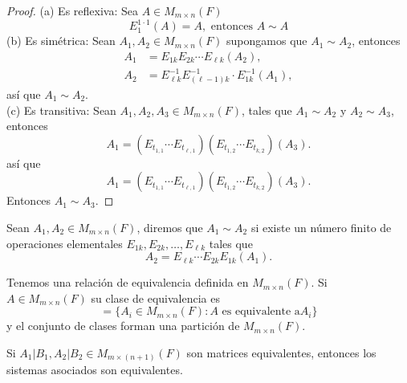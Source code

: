 \documentclass[12pt,a4paper]{book}
\begin{document}
    \begin{proof}
        (a) Es reflexiva: Sea $A\in M_{m\times n}(F)$
        \begin{equation*}
            E_{1}^{1\cdot1}(A)=A,\text{ entonces }A\sim A
        \end{equation*}
        (b) Es simétrica: Sean $A_{1},A_{2}\in M_{m\times n}(F)$ supongamos que $A_{1}\sim A_{2}$,
        entonces
        \begin{align*}
            A_{1}&=E_{1k}E_{2k}\cdots E_{\ell k}(A_{2}),\\
            A_{2}&=E_{\ell k}^{-1}E_{(\ell-1)k}^{-1}\cdot E_{1k}^{-1}(A_{1}),
        \end{align*}
        así que $A_{1}\sim A_{2}$.\\
        (c) Es transitiva: Sean $A_{1},A_{2},A_{3}\in M_{m\times n}(F)$, tales que $A_{1}\sim A_{2}$ y $A_{2}\sim A_{3}$,
        entonces
        \begin{equation*}
            A_{1}=(E_{t_{1,1}}\cdots E_{t_{\ell,1}})(E_{t_{1,2}}\cdots E_{t_{k,2}})(A_{3}).
        \end{equation*}
        así que
        \begin{equation*}
            A_{1}=(E_{t_{1,1}}\cdots E_{t_{\ell,1}})(E_{t_{1,2}}\cdots E_{t_{k,2}})(A_{3}).
        \end{equation*}
        Entonces $A_{1}\sim A_{3}$.
    \end{proof}

    \begin{definicion}
    \label{def:6}
        Sean $A_{1},A_{2}\in M_{m\times n}(F)$, diremos que $A_{1}\sim A_{2}$ si existe un número finito de
        operaciones elementales $E_{1k},E_{2k},\dots,E_{\ell k}$ tales que
        \begin{equation*}
            A_{2}=E_{\ell k}\cdots E_{2k}E_{1k}(A_{1}).
        \end{equation*}
    \end{definicion}

    Tenemos una relación de equivalencia definida en $M_{m\times n}(F)$. Si $A\in M_{m\times n}(F)$ su clase
    de equivalencia es
    \begin{equation*}
        [A]=\biggl\{A_{i}\in M_{m\times n}(F):A\text{ es equivalente a} A_{i}\biggr\}
    \end{equation*}
    y el conjunto de clases forman una partición de $M_{m\times n}(F)$.

    \begin{proposicion}
    \label{prop:3}
        Si $A_{1}|B_{1},A_{2}|B_{2}\in M_{m\times(n+1)}(F)$ son matrices equivalentes, entonces los sistemas asociados
        son equivalentes.
    \end{proposicion}
\end{document}
